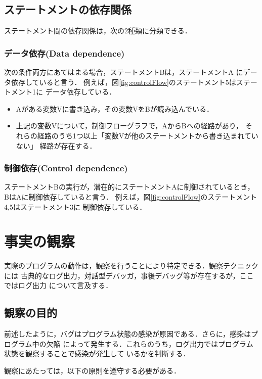 \documentclass{jreport}
\begin{document}
\subsection{ステートメントの依存関係}
\label{ssec:statementDependencies}
ステートメント間の依存関係は，次の2種類に分類できる．

\subsubsection{データ依存(Data dependence)}
次の条件両方にあてはまる場合，ステートメントBは，ステートメントA
にデータ依存していると言う．
例えば，図\ref{fig:controlFlow}のステートメント5はステートメント1に
データ依存している．
\begin{itemize}
  \item Aがある変数Vに書き込み，その変数VをBが読み込んでいる．
  \item 上記の変数Vについて，制御フローグラフで，AからBへの経路があり，
  それらの経路のうち1つ以上「変数Vが他のステートメントから書き込まれていない」
  経路が存在する．
\end{itemize}

\subsubsection{制御依存(Control dependence)}
ステートメントBの実行が，潜在的にステートメントAに制御されているとき，
BはAに制御依存していると言う．
例えば，図\ref{fig:controlFlow}のステートメント4,5はステートメント3に
制御依存している．

\section{事実の観察}
\label{sec:observation}
実際のプログラムの動作は，観察を行うことにより特定できる．観察テクニックには
古典的なログ出力，対話型デバッガ，事後デバッグ等が存在するが，ここではログ出力
について言及する．

\subsection{観察の目的}
\label{ssec:observation purpose}
前述したように，バグはプログラム状態の感染が原因である．さらに，感染はプログラム中の欠陥
によって発生する．これらのうち，ログ出力ではプログラム状態を観察することで感染が発生して
いるかを判断する．

観察にあたっては，以下の原則を遵守する必要がある．
\end{document}
